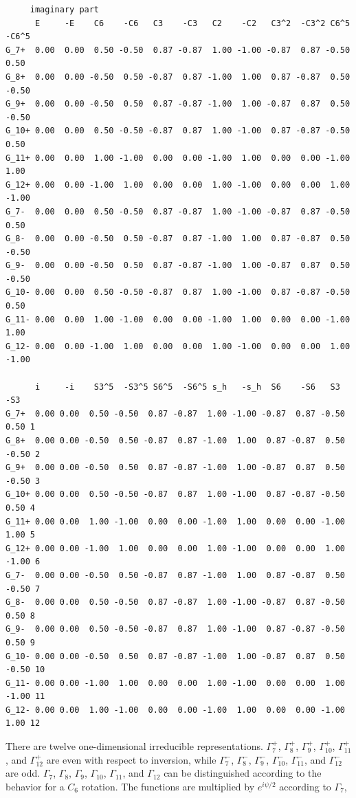 \documentclass[12pt,a4paper]{article}
\begin{document}
\begin{verbatim}
     imaginary part
      E     -E    C6    -C6   C3    -C3   C2    -C2   C3^2  -C3^2 C6^5  -C6^5
G_7+  0.00  0.00  0.50 -0.50  0.87 -0.87  1.00 -1.00 -0.87  0.87 -0.50  0.50
G_8+  0.00  0.00 -0.50  0.50 -0.87  0.87 -1.00  1.00  0.87 -0.87  0.50 -0.50
G_9+  0.00  0.00 -0.50  0.50  0.87 -0.87 -1.00  1.00 -0.87  0.87  0.50 -0.50
G_10+ 0.00  0.00  0.50 -0.50 -0.87  0.87  1.00 -1.00  0.87 -0.87 -0.50  0.50
G_11+ 0.00  0.00  1.00 -1.00  0.00  0.00 -1.00  1.00  0.00  0.00 -1.00  1.00
G_12+ 0.00  0.00 -1.00  1.00  0.00  0.00  1.00 -1.00  0.00  0.00  1.00 -1.00
G_7-  0.00  0.00  0.50 -0.50  0.87 -0.87  1.00 -1.00 -0.87  0.87 -0.50  0.50
G_8-  0.00  0.00 -0.50  0.50 -0.87  0.87 -1.00  1.00  0.87 -0.87  0.50 -0.50
G_9-  0.00  0.00 -0.50  0.50  0.87 -0.87 -1.00  1.00 -0.87  0.87  0.50 -0.50
G_10- 0.00  0.00  0.50 -0.50 -0.87  0.87  1.00 -1.00  0.87 -0.87 -0.50  0.50
G_11- 0.00  0.00  1.00 -1.00  0.00  0.00 -1.00  1.00  0.00  0.00 -1.00  1.00
G_12- 0.00  0.00 -1.00  1.00  0.00  0.00  1.00 -1.00  0.00  0.00  1.00 -1.00

      i     -i    S3^5  -S3^5 S6^5  -S6^5 s_h   -s_h  S6    -S6   S3    -S3
G_7+  0.00 0.00  0.50 -0.50  0.87 -0.87  1.00 -1.00 -0.87  0.87 -0.50  0.50 1
G_8+  0.00 0.00 -0.50  0.50 -0.87  0.87 -1.00  1.00  0.87 -0.87  0.50 -0.50 2
G_9+  0.00 0.00 -0.50  0.50  0.87 -0.87 -1.00  1.00 -0.87  0.87  0.50 -0.50 3
G_10+ 0.00 0.00  0.50 -0.50 -0.87  0.87  1.00 -1.00  0.87 -0.87 -0.50  0.50 4
G_11+ 0.00 0.00  1.00 -1.00  0.00  0.00 -1.00  1.00  0.00  0.00 -1.00  1.00 5
G_12+ 0.00 0.00 -1.00  1.00  0.00  0.00  1.00 -1.00  0.00  0.00  1.00 -1.00 6
G_7-  0.00 0.00 -0.50  0.50 -0.87  0.87 -1.00  1.00  0.87 -0.87  0.50 -0.50 7
G_8-  0.00 0.00  0.50 -0.50  0.87 -0.87  1.00 -1.00 -0.87  0.87 -0.50  0.50 8
G_9-  0.00 0.00  0.50 -0.50 -0.87  0.87  1.00 -1.00  0.87 -0.87 -0.50  0.50 9
G_10- 0.00 0.00 -0.50  0.50  0.87 -0.87 -1.00  1.00 -0.87  0.87  0.50 -0.50 10
G_11- 0.00 0.00 -1.00  1.00  0.00  0.00  1.00 -1.00  0.00  0.00  1.00 -1.00 11
G_12- 0.00 0.00  1.00 -1.00  0.00  0.00 -1.00  1.00  0.00  0.00 -1.00  1.00 12
\end{verbatim} 
There are twelve one-dimensional irreducible representations. 
$\Gamma_7^+$, $\Gamma_8^+$, $\Gamma_9^+$, $\Gamma_{10}^+$, $\Gamma_{11}^+$,
and $\Gamma_{12}^+$ are even with respect to inversion, while 
$\Gamma_7^-$, $\Gamma_8^-$, $\Gamma_9^-$, $\Gamma_{10}^-$, $\Gamma_{11}^-$,
and $\Gamma_{12}^-$ are odd. $\Gamma_7$, $\Gamma_8$, $\Gamma_9$, 
$\Gamma_{10}$, $\Gamma_{11}$, and $\Gamma_{12}$ can be distinguished
according to the behavior for a $C_6$ rotation.
The functions are multiplied by $e^{i\psi/2}$ according to $\Gamma_7$, 
\end{document}
